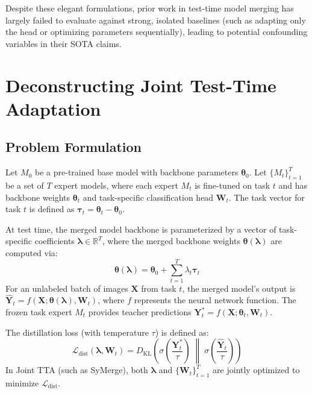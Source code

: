 \documentclass{article}
\theoremstyle{plain}
\theoremstyle{definition}
\theoremstyle{remark}
\begin{document}
Despite these elegant formulations, prior work in test-time model merging has largely failed to evaluate against strong, isolated baselines (such as adapting only the head or optimizing parameters sequentially), leading to potential confounding variables in their SOTA claims.


\section{Deconstructing Joint Test-Time Adaptation}
\label{sec:deconstruction}

\subsection{Problem Formulation}
Let $M_0$ be a pre-trained base model with backbone parameters $\boldsymbol{\theta}_0$. Let $\{M_t\}_{t=1}^T$ be a set of $T$ expert models, where each expert $M_t$ is fine-tuned on task $t$ and has backbone weights $\boldsymbol{\theta}_t$ and task-specific classification head $\mathbf{W}_t$. The task vector for task $t$ is defined as $\boldsymbol{\tau}_t = \boldsymbol{\theta}_t - \boldsymbol{\theta}_0$.

At test time, the merged model backbone is parameterized by a vector of task-specific coefficients $\boldsymbol{\lambda} \in \mathbb{R}^T$, where the merged backbone weights $\boldsymbol{\theta}(\boldsymbol{\lambda})$ are computed via:
\begin{equation}
    \boldsymbol{\theta}(\boldsymbol{\lambda}) = \boldsymbol{\theta}_0 + \sum_{t=1}^T \lambda_t \boldsymbol{\tau}_t
\end{equation}
For an unlabeled batch of images $\mathbf{X}$ from task $t$, the merged model's output is $\hat{\mathbf{Y}}_t = f(\mathbf{X}; \boldsymbol{\theta}(\boldsymbol{\lambda}), \mathbf{W}_t)$, where $f$ represents the neural network function. The frozen task expert $M_t$ provides teacher predictions $\mathbf{Y}_t^* = f(\mathbf{X}; \boldsymbol{\theta}_t, \mathbf{W}_t)$.

The distillation loss (with temperature $\tau$) is defined as:
\begin{equation}
    \mathcal{L}_{\text{dist}}(\boldsymbol{\lambda}, \mathbf{W}_t) = D_{\text{KL}}\left(\sigma\left(\frac{\mathbf{Y}_t^*}{\tau}\right) \;\middle\|\; \sigma\left(\frac{\hat{\mathbf{Y}}_t}{\tau}\right)\right)
\end{equation}
In Joint TTA (such as SyMerge), both $\boldsymbol{\lambda}$ and $\{\mathbf{W}_t\}_{t=1}^T$ are jointly optimized to minimize $\mathcal{L}_{\text{dist}}$.
\end{document}
